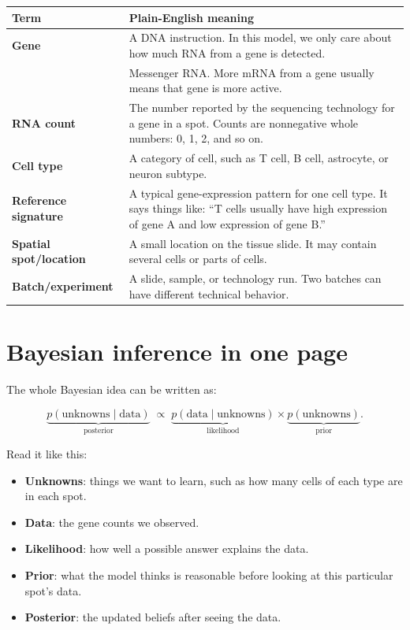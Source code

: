 \documentclass[11pt]{article}
\newcommand{\Data}{\text{data}}
\newcommand{\Unknowns}{\text{unknowns}}
\newcommand{\mRNA}{\text{mRNA}}
\newcommand{\term}[1]{\textbf{#1}}
\begin{document}
\begin{longtable}{>{\bfseries}p{}p{}}
\toprule
Term & Plain-English meaning \\
\midrule
Gene & A DNA instruction. In this model, we only care about how much RNA from a gene is detected. \\
\mRNA & Messenger RNA. More mRNA from a gene usually means that gene is more active. \\
RNA count & The number reported by the sequencing technology for a gene in a spot. Counts are nonnegative whole numbers: 0, 1, 2, and so on. \\
Cell type & A category of cell, such as T cell, B cell, astrocyte, or neuron subtype. \\
Reference signature & A typical gene-expression pattern for one cell type. It says things like: ``T cells usually have high expression of gene A and low expression of gene B.'' \\
Spatial spot/location & A small location on the tissue slide. It may contain several cells or parts of cells. \\
Batch/experiment & A slide, sample, or technology run. Two batches can have different technical behavior. \\
\bottomrule
\end{longtable}

\newpage
\section{Bayesian inference in one page}

The whole Bayesian idea can be written as:

\begin{mathbox}
\[
\underbrace{p(\Unknowns \mid \Data)}_{\text{posterior}}
\;\propto\;
\underbrace{p(\Data \mid \Unknowns)}_{\text{likelihood}}
\times
\underbrace{p(\Unknowns)}_{\text{prior}}.
\]
\end{mathbox}

Read it like this:

\begin{itemize}
  \item \term{Unknowns}: things we want to learn, such as how many cells of each type are in each spot.
  \item \term{Data}: the gene counts we observed.
  \item \term{Likelihood}: how well a possible answer explains the data.
  \item \term{Prior}: what the model thinks is reasonable before looking at this particular spot's data.
  \item \term{Posterior}: the updated beliefs after seeing the data.
\end{itemize}
\end{document}
